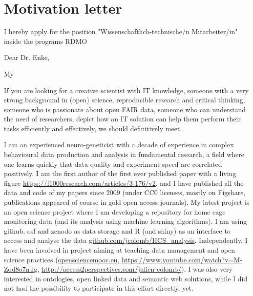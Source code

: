 \section* {Motivation letter}

I hereby apply for the position "Wissenschaftlich-technische/n Mitarbeiter/in" inside the programs RDMO
\vspace {0.5cm} 

Dear Dr. Enke,

My 

If you are looking for a creative scientist with IT knowledge, someone with a very strong background in (open) science, reproducible research and critical thinking, someone who is passionate about open FAIR data, someone who can understand the need of researchers, depict how an IT solution can help them perform their tasks efficiently and effectively, we should definitively meet.

I am an experienced neuro-geneticist with a decade of experience in complex behavioural data production and analysis in fundamental research, a field where one learns quickly that data quality and experiment speed are correlated positively. I am the first author of the first ever published paper with a living figure \url{https://f1000research.com/articles/3-176/v2}, and I have published all the data and code of my papers since 2009 (under CC0 licenses, mostly on Figshare, publications appeared of course in gold open access journals). My latest project is an open science project where I am developing a repository for home cage monitoring data (and its analysis using machine learning algorithms). I am using github, osf and zenodo as data storage and R (and shiny) as an interface to access and analyse the data \url{github.com/jcolomb/HCS_analysis}. Independently, I have been involved in project aiming at teaching data management and open science practices (\url{opensciencemooc.eu}, \url{https://www.youtube.com/watch?v=M-Zod8o7nTg}, \url{http://access2perspectives.com/julien-colomb/}). I was also very interested in ontologies, open linked data and semantic web solutions, while I did not had the possibility to participate in this effort directly, yet.

